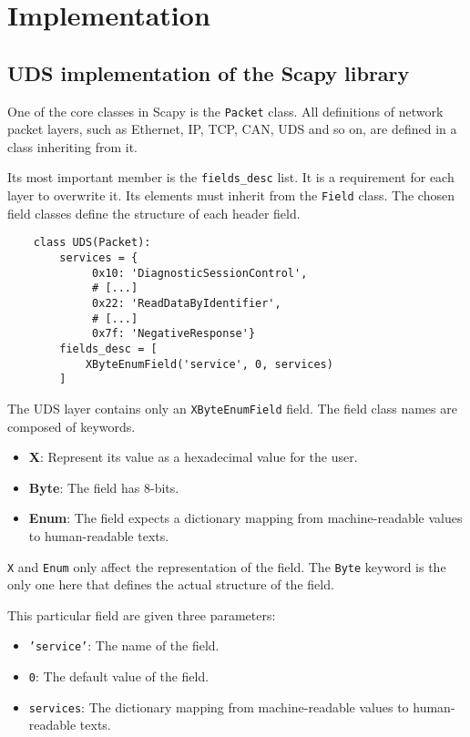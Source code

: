\section{Implementation}

\subsection{UDS implementation of the Scapy library}

One of the core classes in Scapy is the \texttt{Packet} class. All definitions of network packet layers, such as Ethernet, IP, TCP, CAN, UDS and so on, are defined in a class inheriting from it.

Its most important member is the \texttt{fields_desc} list. It is a requirement for each layer to overwrite it. Its elements must inherit from the \texttt{Field} class. The chosen field classes define the structure of each header field.

\begin{samepage}
    \begin{verbatim}
    class UDS(Packet):
        services = {
             0x10: 'DiagnosticSessionControl',
             # [...]
             0x22: 'ReadDataByIdentifier',
             # [...]
             0x7f: 'NegativeResponse'}
        fields_desc = [
            XByteEnumField('service', 0, services)
        ]
    \end{verbatim}
\end{samepage}

The UDS layer contains only an \texttt{XByteEnumField} field. The field class names are composed of keywords.
\begin{itemize}
    \item \textbf{X}: Represent its value as a hexadecimal value for the user.
    \item \textbf{Byte}: The field has 8-bits.
    \item \textbf{Enum}: The field expects a dictionary mapping from machine-readable values to human-readable texts.
\end{itemize}

\texttt{X} and \texttt{Enum} only affect the representation of the field. The \texttt{Byte} keyword is the only one here that defines the actual structure of the field.

This particular field are given three parameters:

\begin{itemize}
    \item \texttt{'service'}: The name of the field.
    \item \texttt{0}: The default value of the field.
    \item \texttt{services}: The dictionary mapping from machine-readable values to human-readable texts.
\end{itemize}

